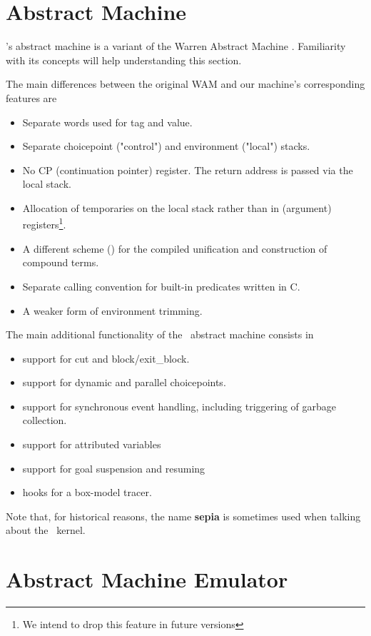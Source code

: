 \section{Abstract Machine}

\eclipse's abstract machine is a variant of the Warren Abstract
Machine \cite{warren83}. Familiarity with its concepts will help
understanding this section.

The main differences between the original WAM and our machine's
corresponding features are
\begin{itemize}
\item Separate words used for tag and value.
\item Separate choicepoint ("control") and environment ("local") stacks.
\item No CP (continuation pointer) register. The return address
        is passed via the local stack.
\item Allocation of temporaries on the local stack rather than in
        (argument) registers\footnote{
        We intend to drop this feature in future versions}.
\item A different scheme (\cite{compnd}) for the compiled
        unification and construction of compound terms.
\item Separate calling convention for built-in predicates
        written in C.
\item A weaker form of environment trimming.
\end{itemize}
The main additional functionality of the \eclipse\ abstract machine
consists in
\begin{itemize}
\item support for cut and block/exit_block.
\item support for dynamic and parallel choicepoints.
\item support for synchronous event handling, including
        triggering of garbage collection.
\item support for attributed variables
\item support for goal suspension and resuming
\item hooks for a box-model tracer.
\end{itemize}
Note that, for historical reasons, the name {\bf sepia} is sometimes
used when talking about the \eclipse\ kernel.


\section{Abstract Machine Emulator}

